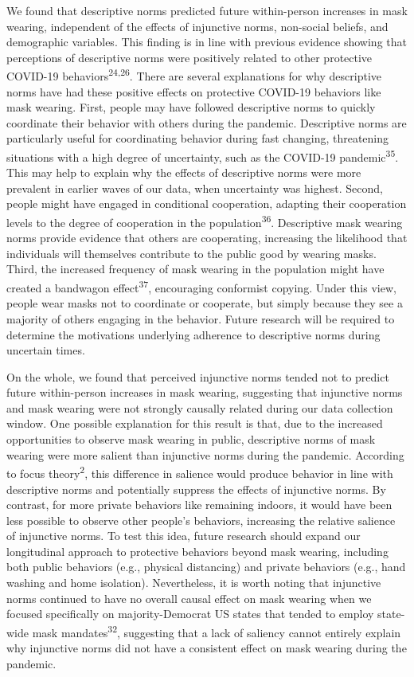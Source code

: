\documentclass[
  man, donotrepeattitle,floatsintext]{apa6}
\begin{document}
We found that descriptive norms predicted future within-person increases in mask wearing, independent of the effects of injunctive norms, non-social beliefs, and demographic variables. This finding is in line with previous evidence showing that perceptions of descriptive norms were positively related to other protective COVID-19 behaviors\textsuperscript{24,26}. There are several explanations for why descriptive norms have had these positive effects on protective COVID-19 behaviors like mask wearing. First, people may have followed descriptive norms to quickly coordinate their behavior with others during the pandemic. Descriptive norms are particularly useful for coordinating behavior during fast changing, threatening situations with a high degree of uncertainty, such as the COVID-19 pandemic\textsuperscript{35}. This may help to explain why the effects of descriptive norms were more prevalent in earlier waves of our data, when uncertainty was highest. Second, people might have engaged in conditional cooperation, adapting their cooperation levels to the degree of cooperation in the population\textsuperscript{36}. Descriptive mask wearing norms provide evidence that others are cooperating, increasing the likelihood that individuals will themselves contribute to the public good by wearing masks. Third, the increased frequency of mask wearing in the population might have created a bandwagon effect\textsuperscript{37}, encouraging conformist copying. Under this view, people wear masks not to coordinate or cooperate, but simply because they see a majority of others engaging in the behavior. Future research will be required to determine the motivations underlying adherence to descriptive norms during uncertain times.

On the whole, we found that perceived injunctive norms tended not to predict future within-person increases in mask wearing, suggesting that injunctive norms and mask wearing were not strongly causally related during our data collection window. One possible explanation for this result is that, due to the increased opportunities to observe mask wearing in public, descriptive norms of mask wearing were more salient than injunctive norms during the pandemic. According to focus theory\textsuperscript{2}, this difference in salience would produce behavior in line with descriptive norms and potentially suppress the effects of injunctive norms. By contrast, for more private behaviors like remaining indoors, it would have been less possible to observe other people's behaviors, increasing the relative salience of injunctive norms. To test this idea, future research should expand our longitudinal approach to protective behaviors beyond mask wearing, including both public behaviors (e.g., physical distancing) and private behaviors (e.g., hand washing and home isolation). Nevertheless, it is worth noting that injunctive norms continued to have no overall causal effect on mask wearing when we focused specifically on majority-Democrat US states that tended to employ state-wide mask mandates\textsuperscript{32}, suggesting that a lack of saliency cannot entirely explain why injunctive norms did not have a consistent effect on mask wearing during the pandemic.
\end{document}
